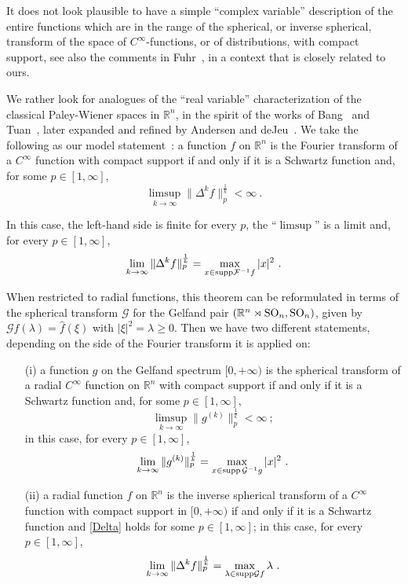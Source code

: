 \documentclass[12pt,a4paper]{amsart}
\theoremstyle{plain}
\theoremstyle{definition}
\numberwithin{equation}{section}
\begin{document}
It does not look plausible to have a simple ``complex variable'' description of the entire functions which are in the range of the spherical, or inverse spherical, transform of the space of $C^\infty$-functions, or of distributions, with compact support, see also the comments in Fuhr~\cite{MN}, in a context that is  closely related to ours.

We rather look for analogues of the ``real variable'' characterization of the classical Paley-Wiener spaces in ${\mathbb R}^n$, in the spirit of the works of Bang~\cite{Bang} 
and Tuan~\cite{Tuan}, later expanded and refined by Andersen and deJeu~\cite{Nils}. 
We take the following as our model statement~\cite{Nils}:
 a function $f$ on ${\mathbb R}^n$ is the Fourier transform of a $C^\infty$ function with compact support if and only if it is a Schwartz function and, for some $p\in[1,\infty]$,
\begin{equation}\label{Delta}
 \limsup_{k\to\infty}\|\Delta^kf\|_p^\frac1k<\infty\ .
 \end{equation}
 
 In this case, the left-hand side is finite for every $p$, the ``$\limsup$'' is a limit and, for every $p\in[1,\infty]$,
 $$
 \lim_{k\to\infty}\|\Delta^kf\|_p^\frac1k=\max_{x\in{\rm supp}{\mathcal F}^{-1} f}|x|^2\ .
 $$ 

When restricted to radial functions, this theorem can be reformulated in terms of the spherical transform ${\mathcal G}$ for the Gelfand pair $({\mathbb R}^n\rtimes{\rm SO}_n,{\rm SO}_n)$, given by ${\mathcal G} f({\lambda})=\hat f(\xi)$ with $|\xi|^2={\lambda}\ge0$. Then we have    two different statements, depending on the side of the Fourier transform it is applied on:
\begin{enumerate}
\item[(i)] a function $g$ on the Gelfand spectrum $[0,+\infty)$ is the spherical transform of a radial $C^\infty$ function on ${\mathbb R}^n$ with compact support if and only if it is a Schwartz function and, for some $p\in[1,\infty]$,
$$
 \limsup_{k\to\infty}\|g^{(k)}\|_p^\frac1k<\infty\ ;
 $$
  in this case, for every $p\in[1,\infty]$, 
$$
 \lim_{k\to\infty}\|g^{(k)}\|_p^\frac1k=\max_{x\in{\text{\rm supp\,}} {\mathcal G}{^{-1}} g}|x|^2\ .
 $$
\item[(ii)] a radial function $f$ on ${\mathbb R}^n$ is the inverse spherical transform of a $C^\infty$ function with compact support in $[0,+\infty)$ if and only if it is a Schwartz function and \eqref{Delta} holds for some $p\in[1,\infty]$; in this case, for every $p\in[1,\infty]$,
 $$
 \lim_{k\to\infty}\|\Delta^kf\|_p^\frac1k=\max_{{\lambda}\in{\rm supp}{\mathcal G} f}{\lambda}\ .
 $$
 \end{enumerate}
 
\end{document}
